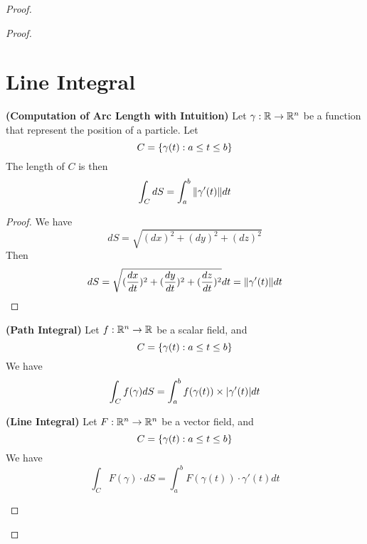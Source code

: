 \documentclass{report}
\begin{document}
\begin{proof}
\begin{proof}
\section{Line Integral}
\begin{theorem}
\textbf{(Computation of Arc Length with Intuition)} Let  $\gamma:\mathbb{R}\rightarrow \mathbb{R}^n$ be a function that represent the position of a particle. Let
\begin{equation}
C=\{ \gamma (t):a\leq t\leq b \}
\end{equation}
The length of $C$ is then
 \begin{equation}
\int_C dS=\int_a^b  \| \gamma '(t) \|dt
\end{equation}
\end{theorem}
\begin{proof}
We have
\begin{equation}
  dS=\sqrt{(dx)^2+(dy)^2+(dz)^2}
\end{equation}
Then 
\begin{equation}
dS=\sqrt{(\frac{dx}{dt})^2+(\frac{dy}{dt})^2+(\frac{dz}{dt})^2}dt=\| \gamma '(t) \|dt
\end{equation}
\end{proof}
\begin{corollary}
\textbf{(Path Integral)} Let $f:\mathbb{R}^n\rightarrow \mathbb{R}$ be a scalar field, and 
\begin{equation}
C=\{ \gamma (t):a\leq t\leq b \}
\end{equation}
We have
\begin{equation}
\int_C f(\gamma )dS=\int_a^b f(\gamma (t)) \times |\gamma '(t)|dt
\end{equation}
\end{corollary}
\begin{corollary}
\textbf{(Line Integral)} Let $F:\mathbb{R}^n\rightarrow \mathbb{R}^n$ be a vector field, and
\begin{equation}
C=\{ \gamma (t):a\leq t\leq  b \}
\end{equation}
We have
\begin{equation}
\int_C F(\gamma )\cdot dS =\int_a^b F(\gamma (t)) \cdot \gamma '(t)dt
\end{equation}
\end{corollary}
\end{proof}
\end{proof}
\end{document}
